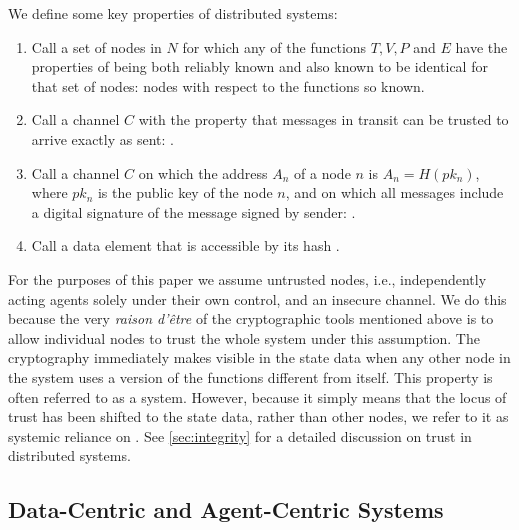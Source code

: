 \documentclass[twocolumn,showpacs,
  nofootinbib,aps,superscriptaddress,
  eqsecnum,prd,notitlepage,showkeys,10pt]{revtex4-1}
\begin{document}
We define some key properties of distributed systems:
\begin{enumerate}
\item Call a set of nodes in $N$ for which any of the functions $T,V,P$ and $E$ have the properties of being both reliably known and also known to be identical for that set of nodes:  nodes with respect to the functions so known.
\item Call a channel $C$ with the property that messages in transit can be trusted to arrive exactly as sent: .
\item Call a channel $C$ on which the address $A_n$ of a node $n$ is $A_n=H(pk_n)$, where $pk_n$ is the public key of the node $n$, and on which all messages include a digital signature of the message signed by sender: .

\item Call a data element that is accessible by its hash .
\end{enumerate}
For the purposes of this paper we assume untrusted nodes, i.e., independently acting agents solely under their own control, and an insecure channel.  We do this because the very \textit{raison d'\^etre} of the cryptographic tools mentioned above is to allow individual nodes to trust the whole system under this assumption.  The cryptography immediately makes visible in the state data when any other node in the system uses a version of the functions different from itself.  This property is often referred to as a  system.  However, because it simply means that the locus of trust has been shifted to the state data, rather than other nodes, we refer to it as systemic reliance on . See \ref{sec:integrity} for a detailed discussion on trust in distributed systems.

\subsection{Data-Centric and Agent-Centric Systems}
\label{sec:data-agent}
\end{document}
